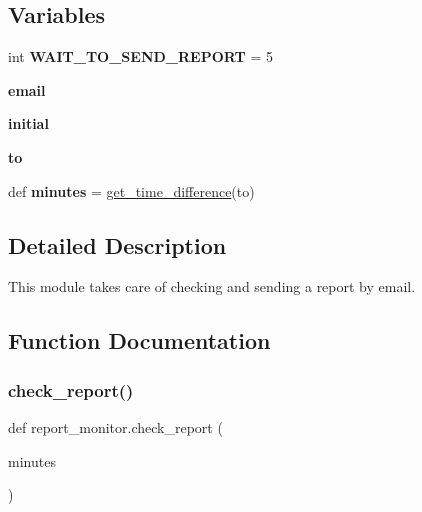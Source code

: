 \subsection*{Variables}
\begin{DoxyCompactItemize}
\item 
\mbox{\label{namespacereport__monitor_ab2763947722a7e3a3d23935f768e6357}} 
int {\bfseries W\+A\+I\+T\+\_\+\+T\+O\+\_\+\+S\+E\+N\+D\+\_\+\+R\+E\+P\+O\+RT} = 5
\item 
\mbox{\label{namespacereport__monitor_a9594b99c40cebce19430c472f825de3c}} 
{\bfseries email}
\item 
\mbox{\label{namespacereport__monitor_aae3129412b156b001eb89d68f7260568}} 
{\bfseries initial}
\item 
\mbox{\label{namespacereport__monitor_a1dc4b001a3374e90eee423c9f4b06b4b}} 
{\bfseries to}
\item 
\mbox{\label{namespacereport__monitor_a4698e6a814dcb02c6a5efa1d4b4e306d}} 
def {\bfseries minutes} = \hyperlink{namespacereport__monitor_aba839cc4a115d3c05481ad49d367f567}{get\+\_\+time\+\_\+difference}(to)
\end{DoxyCompactItemize}


\subsection{Detailed Description}
This module takes care of checking and sending a report by email. 



\subsection{Function Documentation}
\mbox{\label{namespacereport__monitor_ac48ed477bccc0f581f78aaed34ff934a}} 
\subsubsection{\texorpdfstring{check\+\_\+report()}{check\_report()}}
{\footnotesize\ttfamily def report\+\_\+monitor.\+check\+\_\+report (\begin{DoxyParamCaption}\item[{}]{minutes }\end{DoxyParamCaption})}



